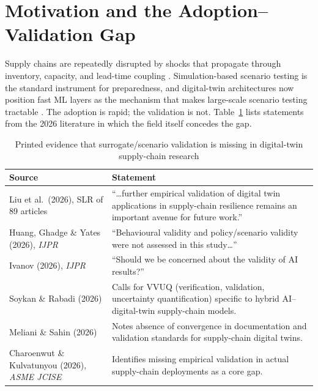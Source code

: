 \documentclass[12pt,a4paper]{article}
\begin{document}
\section{Motivation and the Adoption--Validation Gap}

Supply chains are repeatedly disrupted by shocks that propagate through inventory, capacity, and lead-time coupling \citep{hosseini2019,ivanov2021,lee1997}. Simulation-based scenario testing is the standard instrument for preparedness, and digital-twin architectures now position fast ML layers as the mechanism that makes large-scale scenario testing tractable \citep{ivanov2021,ivanov2026}. The adoption is rapid; the validation is not. Table~\ref{tab:gap} lists statements from the 2026 literature in which the field itself concedes the gap.

\begin{table}[H]
\centering
\caption{Printed evidence that surrogate/scenario validation is missing in digital-twin supply-chain research}
\label{tab:gap}
\footnotesize
\begin{tabular}{p{5.2cm}p{9.3cm}}
\toprule
\textbf{Source} & \textbf{Statement} \\
\midrule
Liu et al.\ (2026), SLR of 89 articles \citep{liu2026} & ``\ldots further empirical validation of digital twin applications in supply-chain resilience remains an important avenue for future work.'' \\
\midrule
Huang, Ghadge \& Yates (2026), \emph{IJPR} \citep{huang2026} & ``Behavioural validity and policy/scenario validity were not assessed in this study\ldots'' \\
\midrule
Ivanov (2026), \emph{IJPR} \citep{ivanov2026} & ``Should we be concerned about the validity of AI results?'' \\
\midrule
Soykan \& Rabadi (2026) \citep{soykan2026} & Calls for VVUQ (verification, validation, uncertainty quantification) specific to hybrid AI--digital-twin supply-chain models. \\
\midrule
Meliani \& Sahin (2026) \citep{meliani2026} & Notes absence of convergence in documentation and validation standards for supply-chain digital twins. \\
\midrule
Charoenwut \& Kulvatunyou (2026), \emph{ASME JCISE} \citep{charoenwut2026} & Identifies missing empirical validation in actual supply-chain deployments as a core gap. \\
\bottomrule
\end{tabular}
\end{table}
\end{document}

